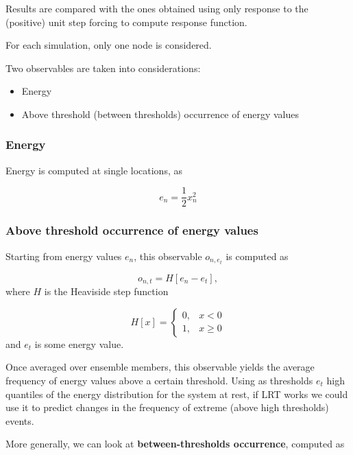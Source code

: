 \documentclass{article}
\begin{document}
Results are compared with the ones obtained using only response to the (positive) unit step forcing to compute response function.

For each simulation, only one node is considered.
 
Two observables are taken into considerations:

\begin{itemize}
	\item Energy
	\item Above threshold (between thresholds) occurrence of energy values
\end{itemize}

\subsubsection{Energy}

Energy is computed at single locations, as

\begin{equation}
e_n=\frac{1}{2} x_n^{2}
\end{equation}

\subsubsection{Above threshold occurrence of energy values}

Starting from energy values $e_n$, this observable $o_{n, e_t}$ is computed as

\begin{equation}
o_{n, t}=H[e_n - e_t],
\end{equation}
where $H$ is the Heaviside step function

\begin{equation}
	H[x]=\left\{\begin{array}{ll}{0,} & {x<0} \\ {1,} & {x \geq 0}\end{array}\right.
\end{equation}
and $e_t$ is some energy value.

Once averaged over ensemble members, this observable yields the average frequency of energy values above a certain threshold. Using as thresholds $e_t$ high quantiles of the energy distribution for the system at rest, if LRT works we could use it to predict changes in the frequency of extreme (above high thresholds) events.

More generally, we can look at \textbf{between-thresholds occurrence}, computed as
\end{document}
